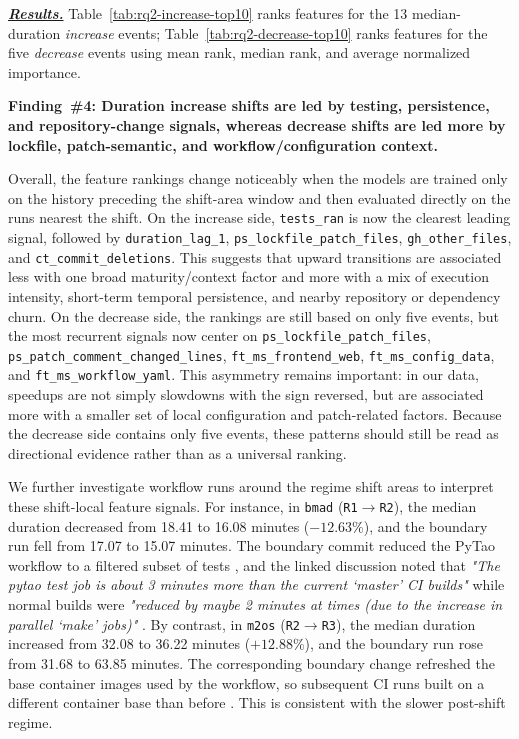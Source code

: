 \documentclass[conference]{IEEEconf}
\begin{document}
\noindent\underline{\textbf{\textit{Results.}}} Table~\ref{tab:rq2-increase-top10} ranks features for the 13 median-duration \emph{increase} events; Table~\ref{tab:rq2-decrease-top10} ranks features for the five \emph{decrease} events using mean rank, median rank, and average normalized importance.

\noindent\textbf{Finding~\#4: Duration increase shifts are led by testing, persistence, and repository-change signals, whereas decrease shifts are led more by lockfile, patch-semantic, and workflow/configuration context.}

Overall, the feature rankings change noticeably when the models are trained only on the history preceding the shift-area window and then evaluated directly on the runs nearest the shift. On the increase side, \texttt{tests\_ran} is now the clearest leading signal, followed by \texttt{duration\_lag\_1}, \texttt{ps\_lockfile\_patch\_files}, \texttt{gh\_other\_files}, and \texttt{ct\_commit\_deletions}. This suggests that upward transitions are associated less with one broad maturity/context factor and more with a mix of execution intensity, short-term temporal persistence, and nearby repository or dependency churn. On the decrease side, the rankings are still based on only five events, but the most recurrent signals now center on \texttt{ps\_lockfile\_patch\_files}, \texttt{ps\_patch\_comment\_changed\_lines}, \texttt{ft\_ms\_frontend\_web}, \texttt{ft\_ms\_config\_data}, and \texttt{ft\_ms\_workflow\_yaml}. This asymmetry remains important: in our data, speedups are not simply slowdowns with the sign reversed, but are associated more with a smaller set of local configuration and patch-related factors. Because the decrease side contains only five events, these patterns should still be read as directional evidence rather than as a universal ranking.

We further investigate workflow runs around the regime shift areas to interpret these shift-local feature signals. For instance, in \texttt{bmad} (\texttt{R1}$\rightarrow$\texttt{R2}), the median duration decreased from 18.41 to 16.08 minutes ($-12.63\%$), and the boundary run fell from 17.07 to 15.07 minutes. The boundary commit reduced the PyTao workflow to a filtered subset of tests \cite{bmadPytaoScopeReductionPR}, and the linked discussion noted that \textit{"The pytao test job is about 3 minutes more than the current `master' CI builds"} while normal builds were \textit{"reduced by maybe 2 minutes at times (due to the increase in parallel `make' jobs)"} \cite{bmadPytaoDurationComment}. By contrast, in \texttt{m2os} (\texttt{R2}$\rightarrow$\texttt{R3}), the median duration increased from 32.08 to 36.22 minutes ($+12.88\%$), and the boundary run rose from 31.68 to 63.85 minutes. The corresponding boundary change refreshed the base container images used by the workflow, so subsequent CI runs built on a different container base than before \cite{m2osBaseImageUpdatePR}. This is consistent with the slower post-shift regime.
\end{document}
